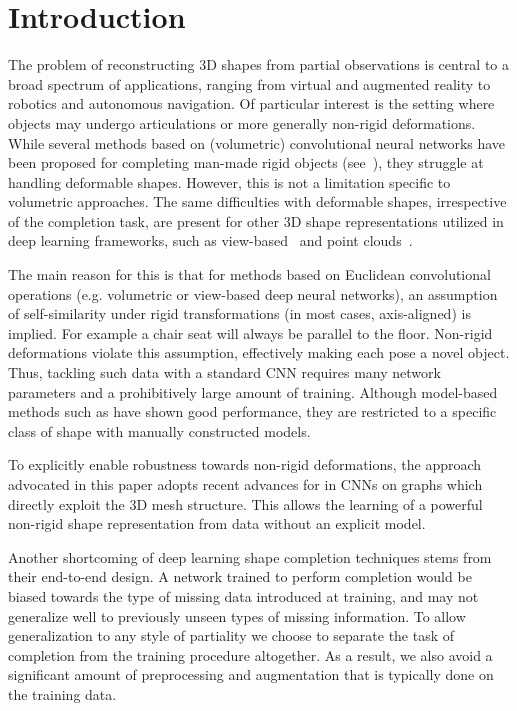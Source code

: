 \documentclass[10pt,twocolumn,letterpaper]{article}
\begin{document}
\section{Introduction}
The problem of reconstructing 3D shapes from partial observations is central to a broad spectrum of applications, ranging from virtual and augmented reality to robotics and autonomous navigation. Of particular interest is the setting where objects may undergo articulations or more generally non-rigid deformations. While several methods based on (volumetric) convolutional neural networks have been proposed for completing man-made rigid objects (see~\cite{dai2016shape,song2016semantic,varley17iros,wu20153d,sharma16eccvw}), they struggle at handling deformable shapes. However, this is not a limitation specific to volumetric approaches. The same difficulties with deformable shapes, irrespective of the completion task, are present for other 3D shape representations utilized in deep learning frameworks, such as view-based~\cite{su2015multi,wei2016dense} and point clouds~\cite{qi2016pointnet,qi2017pointnet++}.

The main reason for this is that for methods based on Euclidean convolutional operations (e.g. volumetric or view-based deep neural networks), an assumption of self-similarity under rigid transformations (in most cases, axis-aligned) is implied. For example a chair seat will always be parallel to the floor. Non-rigid deformations violate this assumption, effectively making each pose a novel object. Thus, tackling such data with a standard CNN requires many network parameters and a prohibitively large amount of training. Although model-based methods such as \cite{anguelov2005scape} have shown good performance, they are restricted to a specific class of shape with manually constructed models. 

To explicitly enable robustness towards non-rigid deformations, the approach advocated in this paper adopts recent advances for in CNNs on graphs which directly exploit the 3D mesh structure. This allows the learning of a powerful non-rigid shape representation from data without an explicit model.

Another shortcoming of deep learning shape completion techniques stems from their end-to-end design. A network trained to perform completion would be biased towards the type of missing data introduced at training, and may not generalize well to previously unseen types of missing information. To allow generalization to any style of partiality we choose to separate the task of completion from the training procedure altogether. As a result, we also avoid a significant amount of preprocessing and augmentation that is typically done on the training data.
\end{document}
